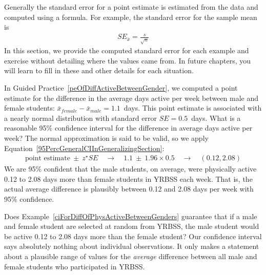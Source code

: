 Generally the standard error for a point estimate is estimated from the data and computed using a formula. For example, the standard error for the sample mean is
\begin{eqnarray*}
SE_{\bar{x}} = \frac{s}{\sqrt{n}}
\end{eqnarray*}
In this section, we provide the computed standard error for each example and exercise without detailing where the values came from. In future chapters, you will learn to fill in these and other details for each situation.

\begin{example}{In Guided Practice~\vref{peOfDiffActiveBetweenGender}, we computed a point estimate for the difference in the average days active per week between male and female students: $\bar{x}_{female}-\bar{x}_{male}=1.1$~days. This point estimate is associated with a nearly normal distribution with standard error $SE = 0.5$~days. What is a reasonable 95\% confidence interval for the difference in average days active per week?}
\label{ciForDiffOfPhysActiveBetweenGenders}
The normal approximation is said to be valid, so we apply Equation~\eqref{95PercGeneralCIInGeneralizingSection}:
\begin{eqnarray*}
\text{point estimate}\ \pm\ z^{\star} SE
	\quad\rightarrow\quad 1.1\ \pm\ 1.96\times 0.5
	\quad\rightarrow\quad (0.12, 2.08)
\end{eqnarray*}
We are 95\% confident that the male students, on average, were physically active 0.12 to 2.08 days more than female students in YRBSS each week. That is, the actual average difference is plausibly between 0.12 and 2.08 days per week with 95\% confidence.
\end{example}


\begin{example}{Does Example~\ref{ciForDiffOfPhysActiveBetweenGenders} guarantee that if a male and female student are selected at random from YRBSS, the male student would be active 0.12 to 2.08 days more than the female student?}
Our confidence interval says absolutely nothing about individual observations. It {only} makes a statement about a plausible range of values for the \emph{average} difference between all male and female students who participated in YRBSS.
\end{example}

